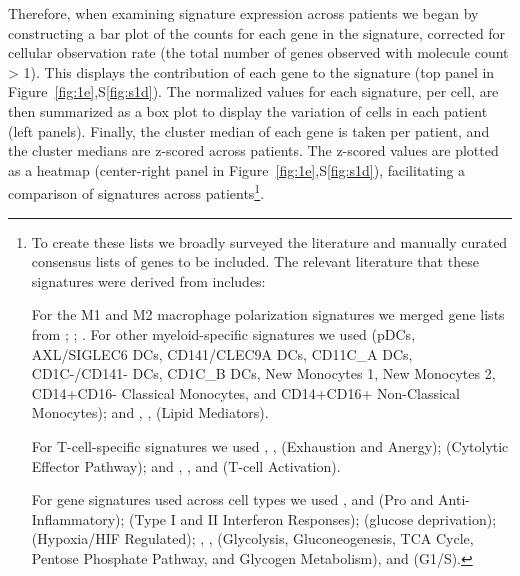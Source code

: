 Therefore, when examining signature expression across patients we began by constructing a bar plot of the counts for each gene in the signature, corrected for cellular observation rate (the total number of genes observed with molecule count \textgreater{} 1).
This displays the contribution of each gene to the signature (top panel in Figure~\ref{fig:1e},S\ref{fig:s1d}).
The normalized values for each signature, per cell, are then summarized as a box plot to display the variation of cells in each patient (left panels).
Finally, the cluster median of each gene is taken per patient, and the cluster medians are z-scored across patients.
The z-scored values are plotted as a heatmap (center-right panel in Figure~\ref{fig:1e},S\ref{fig:s1d}), facilitating a comparison of signatures across patients\footnote{To create these lists we broadly surveyed the literature and manually curated consensus lists of genes to be included.
The relevant literature that these signatures were derived from includes:

For the M1 and M2 macrophage polarization signatures we merged gene lists from \citep{Sica2012}; \citep{Biswas2010}; \citep{Bronte2016} \citep{Ugel2015} \citep{Gabrilovich2017}.
For other myeloid-specific signatures we used \citep{Villani2017} (pDCs, AXL/SIGLEC6 DCs, CD141/CLEC9A DCs, CD11C\_A DCs, CD1C-/CD141- DCs, CD1C\_B DCs, New Monocytes 1, New Monocytes 2, CD14+CD16- Classical Monocytes, and CD14+CD16+ Non-Classical Monocytes); and \citep{Gesta2007}, \citep{Perera2006}, \citep{Farmer2006,Lefterova2009} (Lipid Mediators).

For T-cell-specific signatures we used \citep{Wherry2015}, \citep{Wherry2011}, \citep{Schietinger2012} (Exhaustion and Anergy); \citep{Glimcher2004} (Cytolytic Effector Pathway); and \citep{Smith-Garvin2009}, \citep{Chtanova2005}, and \citep{AdamBest2013} (T-cell Activation).

For gene signatures used across cell types we used \citep{Mantovani2008}, and \citep{Grivennikov2010} (Pro and Anti-Inflammatory); \citep{Platanias2005} (Type I and II Interferon Responses); \citep{Ho2015} (glucose deprivation); \citep{Benita2009,Makino2003} (Hypoxia/HIF Regulated); \citep{Moreno-Sanchez2009}, \citep{Caton2010,Funes2007,Mues2009}, \citep{Beale2007} (Glycolysis, Gluconeogenesis, TCA Cycle, Pentose Phosphate Pathway, and Glycogen Metabolism), and \citep{Whitfield2002} (G1/S).}.




